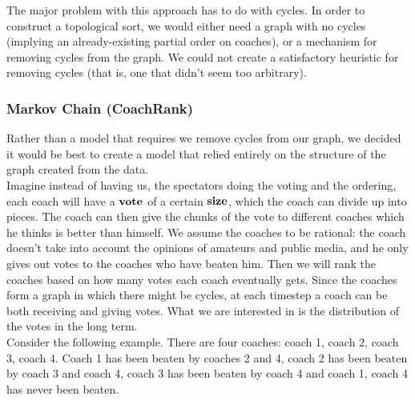 \documentclass[11pt,notitlepage]{article}
\begin{document}
\noindent The major problem with this approach has to do with cycles. In order to construct a topological sort, we would either need a graph with no cycles (implying an already-existing partial order on coaches), or a mechanism for removing cycles from the graph. We could not create a satisfactory heuristic for removing cycles (that is, one that didn't seem too arbitrary).

\subsubsection{Markov Chain (CoachRank)}
Rather than a model that requires we remove cycles from our graph, we decided it would be best to create a model that relied entirely on the structure of the graph created from the data.
\\

\noindent Imagine instead of having us, the spectators doing the voting and the ordering, each coach will have a $\bf{vote}$ of a certain $\bf{size}$, which the coach can divide up into pieces. The coach can then give the chunks of the vote to different coaches which he thinks is better than himself. We assume the coaches to be rational: the coach doesn't take into account the opinions of amateurs and public media, and he only gives out votes to the coaches who have beaten him. Then we will rank the coaches based on how many votes each coach eventually gets. Since the coaches form a graph in which there might be cycles, at each timestep a coach can be both receiving and giving votes. What we are interested in is the distribution of the votes in the long term.
\\

\noindent Consider the following example. There are four coaches: coach 1, coach 2, coach 3, coach 4. Coach 1 has been beaten by coaches 2 and 4, coach 2 has been beaten by coach 3 and coach 4, coach 3 has been beaten by coach 4 and coach 1, coach 4 has never been beaten.
\end{document}
